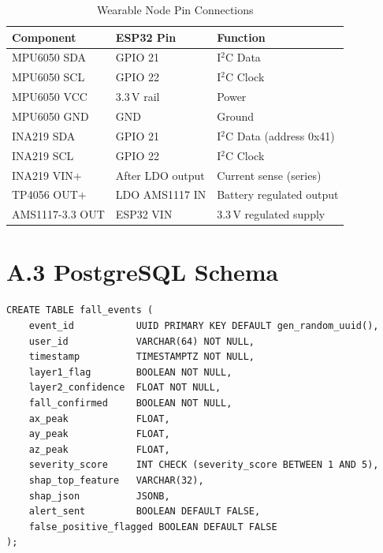 \begin{table}[H]
    \centering
    \caption*{Wearable Node Pin Connections}
    \begin{tabular}{|l|l|l|}
        \hline
        \textbf{Component} & \textbf{ESP32 Pin} & \textbf{Function} \\
        \hline
        MPU6050 SDA & GPIO 21 & I$^2$C Data \\
        MPU6050 SCL & GPIO 22 & I$^2$C Clock \\
        MPU6050 VCC & 3.3\,V rail & Power \\
        MPU6050 GND & GND & Ground \\
        INA219 SDA & GPIO 21 & I$^2$C Data (address 0x41) \\
        INA219 SCL & GPIO 22 & I$^2$C Clock \\
        INA219 VIN+ & After LDO output & Current sense (series) \\
        TP4056 OUT+ & LDO AMS1117 IN & Battery regulated output \\
        AMS1117-3.3 OUT & ESP32 VIN & 3.3\,V regulated supply \\
        \hline
    \end{tabular}
\end{table}

\section*{A.3 \quad PostgreSQL Schema}

\begin{verbatim}
CREATE TABLE fall_events (
    event_id           UUID PRIMARY KEY DEFAULT gen_random_uuid(),
    user_id            VARCHAR(64) NOT NULL,
    timestamp          TIMESTAMPTZ NOT NULL,
    layer1_flag        BOOLEAN NOT NULL,
    layer2_confidence  FLOAT NOT NULL,
    fall_confirmed     BOOLEAN NOT NULL,
    ax_peak            FLOAT,
    ay_peak            FLOAT,
    az_peak            FLOAT,
    severity_score     INT CHECK (severity_score BETWEEN 1 AND 5),
    shap_top_feature   VARCHAR(32),
    shap_json          JSONB,
    alert_sent         BOOLEAN DEFAULT FALSE,
    false_positive_flagged BOOLEAN DEFAULT FALSE
);
\end{verbatim}
